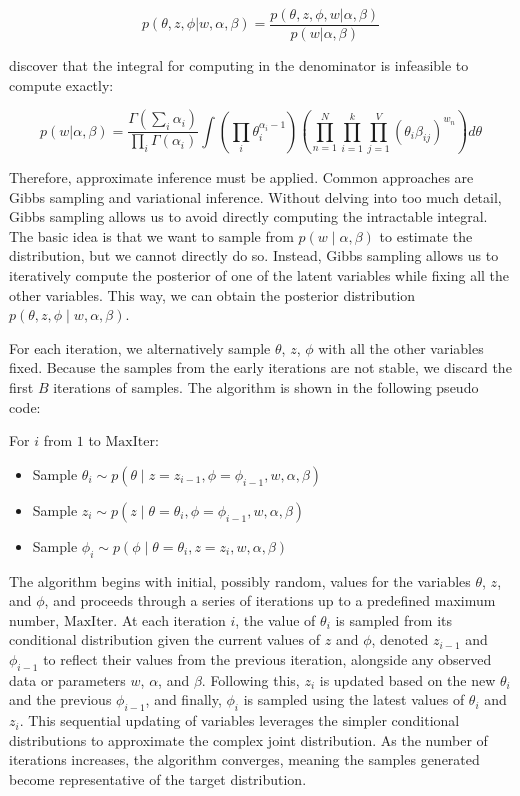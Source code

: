 \[ p(\theta, z, \phi | w, \alpha, \beta) = \frac{p(\theta, z, \phi, w | \alpha, \beta)}{p(w | \alpha, \beta)} \]

\citet{blei_latent_2001} discover that the integral for computing in the denominator is infeasible to compute exactly:

\[ p(w | \alpha, \beta) = \frac{\Gamma(\sum_i \alpha_i)}{\prod_i \Gamma(\alpha_i)} \int \left( \prod_i \theta_i^{\alpha_i - 1} \right) \left( \prod_{n=1}^{N} \prod_{i=1}^{k} \prod_{j=1}^{V} (\theta_i \beta_{ij})^{w_{n}} \right) d\theta \]

Therefore, approximate inference must be applied. Common approaches are Gibbs sampling and variational inference. Without delving into too much detail, Gibbs sampling allows us to avoid directly computing the intractable integral. The basic idea is that we want to sample from \(p(w \mid \alpha, \beta)\) to estimate the distribution, but we cannot directly do so. Instead, Gibbs sampling allows us to iteratively compute the posterior of one of the latent variables while fixing all the other variables. This way, we can obtain the posterior distribution \(p(\theta, z, \phi \mid w, \alpha, \beta)\).

For each iteration, we alternatively sample \(\theta\), \(z\), \(\phi\) with all the other variables fixed. Because the samples from the early iterations are not stable, we discard the first \(B\) iterations of samples. The algorithm is shown in the following pseudo code:


For \(i\) from \(1\) to \(\text{MaxIter}\):
\begin{itemize}
    \item Sample \(\theta_{i} \sim p(\theta \mid z = z_{i-1}, \phi = \phi_{i-1}, w, \alpha, \beta)\)
    \item Sample \(z_{i} \sim p(z \mid \theta = \theta_{i}, \phi = \phi_{i-1}, w, \alpha, \beta)\)
    \item Sample \(\phi_{i} \sim p(\phi \mid \theta = \theta_{i}, z = z_{i}, w, \alpha, \beta)\)
\end{itemize}

The algorithm begins with initial, possibly random, values for the variables \(\theta\), \(z\), and \(\phi\), and proceeds through a series of iterations up to a predefined maximum number, \(\text{MaxIter}\). At each iteration \(i\), the value of \(\theta_i\) is sampled from its conditional distribution given the current values of \(z\) and \(\phi\), denoted \(z_{i-1}\) and \(\phi_{i-1}\) to reflect their values from the previous iteration, alongside any observed data or parameters \(w\), \(\alpha\), and \(\beta\). Following this, \(z_i\) is updated based on the new \(\theta_i\) and the previous \(\phi_{i-1}\), and finally, \(\phi_i\) is sampled using the latest values of \(\theta_i\) and \(z_i\). This sequential updating of variables leverages the simpler conditional distributions to approximate the complex joint distribution. As the number of iterations increases, the algorithm converges, meaning the samples generated become representative of the target distribution.

